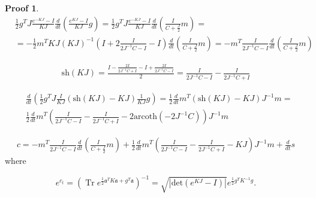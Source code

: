 \documentclass[12pt]{article}
\theoremstyle{definition}
\newtheorem*{demo}{Proof}
\newcommand\Tr{\operatorname{Tr}}
\newcommand{\mf}[1]{\mathfrak{#1}}
\begin{document}
\begin{demo}
		\begin{align*}
			&\frac{1}{2}g^TJ\frac{e^{-KJ} - I}{KJ}\frac{d}{dt}\left( \frac{e^{KJ} - I}{KJ}g  \right) = \frac{1}{2}g^TJ\frac{e^{-KJ} - I}{KJ}\frac{d}{dt}\left(\frac{I}{C + \frac{J}{2}}m\right) =\nonumber\\
			&=-\frac{1}{2}m^TKJ(KJ)^{-1}\left(I + 2\frac{I}{2J^{-1}C - I} - I\right)\frac{d}{dt}\left(\frac{I}{C + \frac{J}{2}}m\right) = -m^T\frac{I}{2J^{-1}C -  I}\frac{d}{dt}\left(\frac{I}{C + \frac{J}{2}}m\right)
		\end{align*}
		
		\begin{align*}
			\text{sh}(KJ) = \frac{I - \frac{2I}{2J^{-1}C + I} - I + \frac{2I}{2J^{-1}C - I}}{2} = \frac{I}{2J^{-1}C - I} - \frac{I}{2J^{-1}C + I}
		\end{align*}
		
		\begin{align*}
			&\frac{d}{dt}\left(  \frac{1}{2}g^TJ\frac{I}{KJ}(\text{sh}(KJ) - KJ)\frac{1}{KJ}g\right) = \frac{1}{2}\frac{d}{dt}m^T(\text{sh}(KJ) - KJ)J^{-1}m = \nonumber\\
			&\frac{1}{2}\frac{d}{dt}m^T\left( \frac{I}{2J^{-1}C - I} - \frac{I}{2J^{-1}C + I} - 2\text{arcoth}(-2J^{-1}C) \right)J^{-1}m
		\end{align*}
		
		\begin{align*}
			c = -m^T\frac{I}{2J^{-1}C -  I}\frac{d}{dt}\left(\frac{I}{C + \frac{J}{2}}m\right) + \frac{1}{2}\frac{d}{dt}m^T\left( \frac{I}{2J^{-1}C - I} - \frac{I}{2J^{-1}C + I} - KJ \right)J^{-1}m + \frac{d}{dt}s
		\end{align*}
		where
		
		\begin{equation}
			\label{eq:c}
			e^{c_t} = \left(\Tr e^{\frac{1}{2} \mathfrak{a}^TK\mathfrak{a} + g^T\mf{a}}\right)^{-1} = \sqrt{\left|\text{det}(e^{KJ} - I)\right|}e^{\frac{1}{2}g^TK^{-1}g}.
		\end{equation}
	\end{demo}
	
\end{document}
